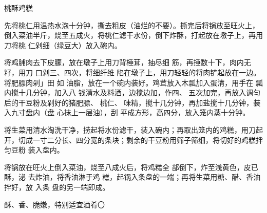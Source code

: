 \begin{recipe}{桃酥鸡糕}

\ingredients


\preparation

\step 先将桃仁用温热水泡十分钟，撕去粗皮（油烂的不要）。撕完后将锅放至旺火上，
倒入菜油半斤，烧至五成火，将桃仁滤干水份，倒下炸酥，打起放在墩子上，再用刀将桃
仁剁细（绿豆大）放入碗内。

将鸡脯肉去下皮朦，放在墩子上用刀背棰茸，抽尽细 筋，再捶数十下，肉内无籽，用刀
口剁三、四次，将细纤维 陷在墩子上，用刀轻轻的将肉铲起放在一边。将肥膘肉剁」田
如 油脂，放在一个碗内装好。鸡茸放入木瓢加入蛋清，用手在 瓢内搅十几分钟，加入八
钱清水及料酒，边搅边加，作四、 五次加完，再放入调匀后的干豆粉及剁好的猪肥膘、
桃仁、 味精，搅十几分钟，再加盐搅十几分钟，装入九寸盘内（盘 心抹上一层油），刮
平成方形，高四分，放入笼内蒸十分钟。

\step 将生菜用清水淘洗干净，捞起将水份滤干，装入碗内；再取出笼内的鸡糕，用刀起
开，切成一寸二分长、四分宽的条块；剩余的干豆粉用筛子筛细，将切好的鸡糕拌匀豆粉
装入盘内。

将锅放在旺火上倒入菜油，烧至八成火后，将鸡糕全 部倒下，炸至浅黄色，皮已酥，泌
去炸油，将香油淋于鸡 糕，起锅入条盘的一端；再将生菜用糖、醋、香油拌好，放 入条
盘的另一端即成。

\features

酥、香、脆嫩，特别适宜酒肴〇

\end{recipe}

